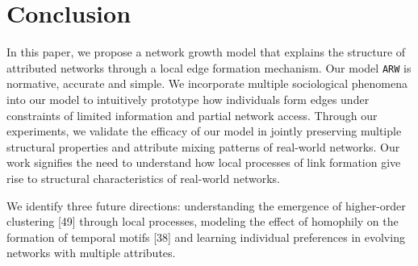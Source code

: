 \section{Conclusion}
\label{sec:Conclusion}
In this paper, we propose a network growth model that explains the
structure of attributed networks through a local edge formation mechanism. Our
model \texttt{ARW} is normative, accurate and simple. We incorporate multiple
sociological phenomena into our model to intuitively prototype how individuals
form edges under constraints of limited information and partial network access.
Through our experiments, we validate the efficacy of our model in jointly preserving
multiple structural properties and attribute mixing patterns of real-world networks.
Our work signifies the need to understand how local processes of link formation
give rise to structural characteristics of real-world networks.


We identify three future directions: understanding the emergence of higher-order clustering [49]
through local processes, modeling the effect of homophily on the formation of temporal motifs [38]
and learning individual preferences in evolving networks with multiple attributes.

